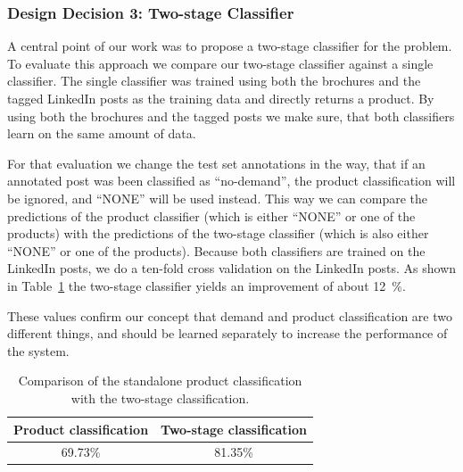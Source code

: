 \subsubsection{Design Decision 3: Two-stage Classifier}
\label{sub:two_stage_classifier}

A central point of our work was to propose a two-stage classifier for the \nto problem.
To evaluate this approach we compare our two-stage classifier against a single classifier.
The single classifier was trained using both the brochures and the tagged LinkedIn posts as the training data and directly returns a product.
By using both the brochures and the tagged posts we make sure, that both classifiers learn on the same amount of data.

For that evaluation we change the test set annotations in the way, that if an annotated post was been classified as ``no-demand'', the product classification will be ignored, and ``NONE'' will be used instead.
This way we can compare the predictions of the product classifier (which is either ``NONE'' or one of the products) with the predictions of the two-stage classifier (which is also either ``NONE'' or one of the products).
Because both classifiers are trained on the LinkedIn posts, we do a ten-fold cross validation on the LinkedIn posts.
As shown in Table~\ref{table:two_stage_eval} the two-stage classifier yields an improvement of about 12~\%.

These values confirm our concept that demand and product classification are two different things, and should be learned separately to increase the performance of the system.

\begin{table}
	\centering
	\begin{tabular}{c|c}
		\hline
		Product classification & Two-stage classification \\
		\hline \hline
		69.73\% & 81.35\% \\
		\hline
	\end{tabular}
	\caption{Comparison of the standalone product classification with the two-stage classification.}
	\label{table:two_stage_eval}
\end{table}

